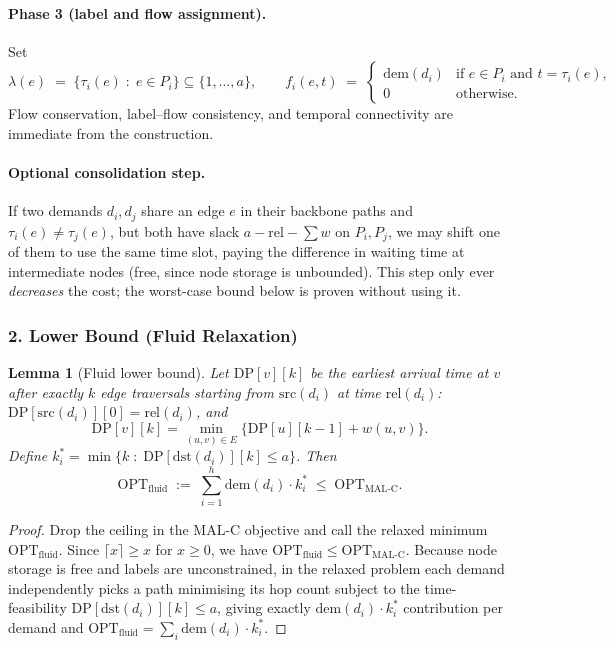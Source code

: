 \documentclass[12pt, a4paper]{article}
\newtheorem{lemma}{Lemma}
\begin{document}
\paragraph{Phase 3 (label and flow assignment).}
Set
\[
\lambda(e) \;=\; \bigl\{\tau_i(e) \;:\; e\in P_i\bigr\}\subseteq\{1,\dots,a\},\qquad
f_i(e,t) \;=\; \begin{cases}\mathrm{dem}(d_i) & \text{if } e\in P_i \text{ and } t=\tau_i(e),\\ 0 & \text{otherwise.}\end{cases}
\]
Flow conservation, label--flow consistency, and temporal connectivity are immediate from the construction.

\paragraph{Optional consolidation step.}
If two demands $d_i,d_j$ share an edge $e$ in their backbone paths and $\tau_i(e)\ne\tau_j(e)$, but both have slack $a-\mathrm{rel}-\sum w$ on $P_i,P_j$, we may shift one of them to use the same time slot, paying the difference in waiting time at intermediate nodes (free, since node storage is unbounded). This step only ever \emph{decreases} the cost; the worst-case bound below is proven without using it.

\subsubsection*{2. Lower Bound (Fluid Relaxation)}

\begin{lemma}[Fluid lower bound]
\label{lem:fluid}
Let $\mathrm{DP}[v][k]$ be the earliest arrival time at $v$ after exactly $k$ edge traversals starting from $\mathrm{src}(d_i)$ at time $\mathrm{rel}(d_i)$:
$\mathrm{DP}[\mathrm{src}(d_i)][0]=\mathrm{rel}(d_i)$, and
\[
\mathrm{DP}[v][k] = \min_{(u,v)\in E}\{\mathrm{DP}[u][k-1]+w(u,v)\}.
\]
Define $k_i^* = \min\{k\;:\;\mathrm{DP}[\mathrm{dst}(d_i)][k]\le a\}$. Then
\[
\mathrm{OPT}_\mathrm{fluid} \;:=\; \sum_{i=1}^{h}\mathrm{dem}(d_i)\cdot k_i^* \;\le\; \mathrm{OPT}_\mathrm{MAL\text{-}C}.
\]
\end{lemma}
\begin{proof}
Drop the ceiling in the MAL-C objective and call the relaxed minimum $\mathrm{OPT}_\mathrm{fluid}$. Since $\lceil x\rceil\ge x$ for $x\ge 0$, we have $\mathrm{OPT}_\mathrm{fluid}\le \mathrm{OPT}_\mathrm{MAL\text{-}C}$. Because node storage is free and labels are unconstrained, in the relaxed problem each demand independently picks a path minimising its hop count subject to the time-feasibility $\mathrm{DP}[\mathrm{dst}(d_i)][k]\le a$, giving exactly $\mathrm{dem}(d_i)\cdot k_i^*$ contribution per demand and $\mathrm{OPT}_\mathrm{fluid}=\sum_i \mathrm{dem}(d_i)\cdot k_i^*$.
\end{proof}
\end{document}
